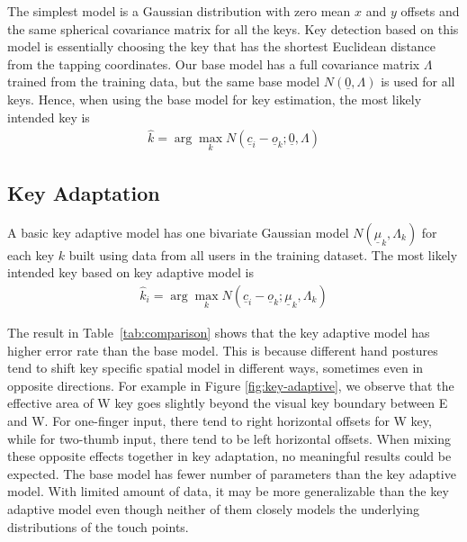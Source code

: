 \documentclass{sigchi}
\begin{document}
The simplest model is a Gaussian distribution with zero mean $x$ and $y$
 offsets and the same spherical covariance matrix for all the keys. Key
detection based on this model is essentially choosing the key that has the shortest Euclidean distance from the tapping coordinates. 
Our base model has a full covariance matrix $\Lambda$ trained from the
training data, but the same base model $N(\underline 0, \Lambda)$ is used for all keys. Hence, when using the base model for key estimation, the most likely intended key is
\begin{align}          
\hat k = \arg\max_k N(\underline c_i - \underline o_k; \underline 0, \Lambda)
\end{align}


\subsection{Key Adaptation}
A basic key adaptive model has one bivariate Gaussian model
$N(\underline\mu_k, \Lambda_k)$ for each key $k$ built  using data from all users in the training dataset. The most likely intended key based on key adaptive model is
\begin{align}          
\hat k_i = \arg\max_k N(\underline c_i - \underline o_k; \underline \mu_k, \Lambda_k)
\end{align}

The result in Table~\ref{tab:comparison} shows that the key adaptive 
model has higher error rate than the base model. This is because different hand
postures tend to shift key specific spatial model in different ways, sometimes even in opposite
directions. For example in Figure \ref{fig:key-adaptive}, we observe that the
effective area of W key goes slightly beyond the visual key boundary between E 
and W. For one-finger input, there tend to right horizontal offsets for W key, 
while for two-thumb input, there tend to be left horizontal offsets. When mixing
these opposite effects together in key adaptation, no meaningful results could
be expected. The base model has fewer number of
parameters than the key adaptive model. With limited amount of data, it
may be more generalizable than the key adaptive model even though neither
of them closely models the underlying distributions of the touch points.
\end{document}
